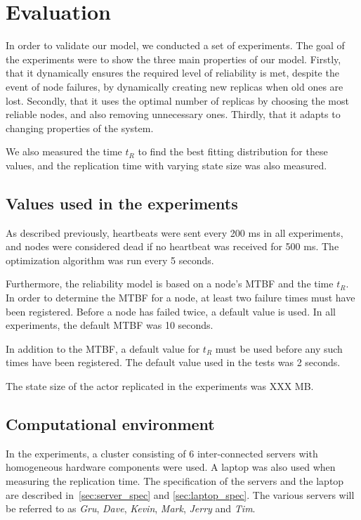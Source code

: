 \documentclass{cslthse-msc}
\begin{document}
\chapter{Evaluation} \label{ch:evaluation}
In order to validate our model, we conducted a set of experiments. The goal of the experiments were to show the three main properties of our model. Firstly, that it dynamically ensures the required level of reliability is met, despite the event of node failures, by dynamically creating new replicas when old ones are lost. Secondly, that it uses the optimal number of replicas by choosing the most reliable nodes, and also removing unnecessary ones. Thirdly, that it adapts to changing properties of the system. 

We also measured the time $t_R$ to find the best fitting distribution for these values, and the replication time with varying state size was also measured.


\section{Values used in the experiments} \label{sec:eval_values}
As described previously, heartbeats were sent every 200 ms in all experiments, and nodes were considered dead if no heartbeat was received for 500 ms. The optimization algorithm was run every 5 seconds.

Furthermore, the reliability model is based on a node's MTBF and the time $t_R$. In order to determine the MTBF for a node, at least two failure times must have been registered. Before a node has failed twice, a default value is used. In all experiments, the default MTBF was 10 seconds.

In addition to the MTBF, a default value for $t_R$ must be used before any such times have been registered. The default value used in the tests was 2 seconds.

The state size of the actor replicated in the experiments was XXX MB.

\section{Computational environment} \label{sec:eval_comp_env}
In the experiments, a cluster consisting of 6 inter-connected servers with homogeneous hardware components were used. A laptop was also used when measuring the replication time. The specification of the servers and the laptop are described in~\cref{sec:server_spec} and \cref{sec:laptop_spec}. The various servers will be referred to as \emph{Gru}, \emph{Dave}, \emph{Kevin}, \emph{Mark}, \emph{Jerry} and \emph{Tim}.
\end{document}
